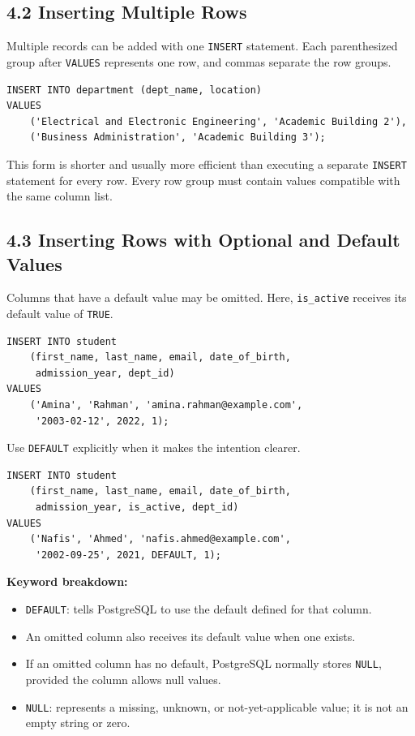 \documentclass[12pt,a4paper]{article}
\begin{document}
\subsection*{4.2 Inserting Multiple Rows}
Multiple records can be added with one \texttt{INSERT} statement. Each parenthesized group after
\texttt{VALUES} represents one row, and commas separate the row groups.

\begin{verbatim}
INSERT INTO department (dept_name, location)
VALUES
    ('Electrical and Electronic Engineering', 'Academic Building 2'),
    ('Business Administration', 'Academic Building 3');
\end{verbatim}

\noindent This form is shorter and usually more efficient than executing a separate
\texttt{INSERT} statement for every row. Every row group must contain values compatible with the
same column list.

\subsection*{4.3 Inserting Rows with Optional and Default Values}
Columns that have a default value may be omitted. Here, \texttt{is\_active} receives its default
value of \texttt{TRUE}.

\begin{verbatim}
INSERT INTO student
    (first_name, last_name, email, date_of_birth,
     admission_year, dept_id)
VALUES
    ('Amina', 'Rahman', 'amina.rahman@example.com',
     '2003-02-12', 2022, 1);
\end{verbatim}

Use \texttt{DEFAULT} explicitly when it makes the intention clearer.

\begin{verbatim}
INSERT INTO student
    (first_name, last_name, email, date_of_birth,
     admission_year, is_active, dept_id)
VALUES
    ('Nafis', 'Ahmed', 'nafis.ahmed@example.com',
     '2002-09-25', 2021, DEFAULT, 1);
\end{verbatim}

\noindent\textbf{Keyword breakdown:}
\begin{itemize}
    \item \texttt{DEFAULT}: tells PostgreSQL to use the default defined for that column.
    \item An omitted column also receives its default value when one exists.
    \item If an omitted column has no default, PostgreSQL normally stores \texttt{NULL}, provided the column allows null values.
    \item \texttt{NULL}: represents a missing, unknown, or not-yet-applicable value; it is not an empty string or zero.
\end{itemize}
\end{document}

